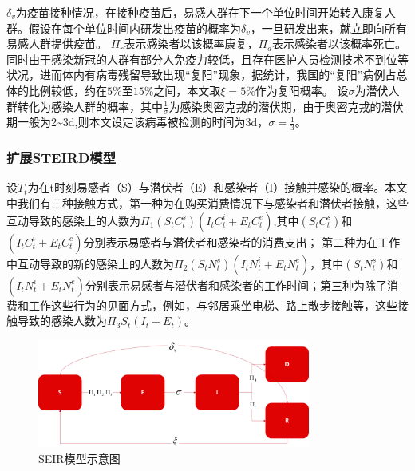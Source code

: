 $\delta_v$为疫苗接种情况，在接种疫苗后，易感人群在下一个单位时间开始转入康复人群。假设在每个单位时间内研发出疫苗的概率为$\delta_v$，一旦研发出来，就立即向所有易感人群提供疫苗。
$\Pi_r$表示感染者以该概率康复，$\Pi_d$表示感染者以该概率死亡\cite{eichenbaum2021macroeconomics}。同时由于感染新冠的人群有部分人免疫力较低，且存在医护人员检测技术不到位等状况，进而体内有病毒残留导致出现“复阳”现象，据统计，我国的“复阳”病例占总体的比例较低，约在$5\%$至$15\%$之间，本文取$\xi=5\%$作为复阳概率\cite{郭慧敏2023基于隔离人群的}。
设$\sigma$为潜伏人群转化为感染人群的概率，其中$\frac{1}{\sigma}$为感染奥密克戎的潜伏期，由于奥密克戎的潜伏期一般为2\~{}3d,则本文设定该病毒被检测的时间为3d，$\sigma=\frac{1}{3}$\cite{杨利超2024基于真实世界数据的修正}。

\subsubsection{扩展STEIRD模型}
设$T_t$为在t时刻易感者（S）与潜伏者（E）和感染者（I）接触并感染的概率。本文中我们有三种接触方式，第一种为在购买消费情况下与感染者和潜伏者接触，这些互动导致的感染上的人数为$\Pi_1(S_t C_{t}^{s})(I_t C_{t}^{i}+E_t C_{t}^{e})$,其中$(S_t C_{t}^{s})$和$(I_t C_{t}^{i}+E_t C_{t}^{e})$分别表示易感者与潜伏者和感染者的消费支出；
第二种为在工作中互动导致的新的感染上的人数为$\Pi_2(S_t N_{t}^{s})(I_t N_{t}^{i}+E_t N_{t}^{e})$，其中$(S_t N_{t}^{s})$和$(I_t N_{t}^{i}+E_t N_{t}^{e})$分别表示易感者与潜伏者和感染者的工作时间；第三种为除了消费和工作这些行为的见面方式，例如，与邻居乘坐电梯、路上散步接触等，这些接触导致的感染人数为$\Pi_3 S_{t}(I_{t}+E_{t})$。
\vspace{32pt}
\begin{figure}[htbp]
    \centering
    \includegraphics[width=0.8\textwidth]{fig/image057.png}
    \caption{SEIR模型示意图}
    \label{fig:ima29}
\end{figure}

